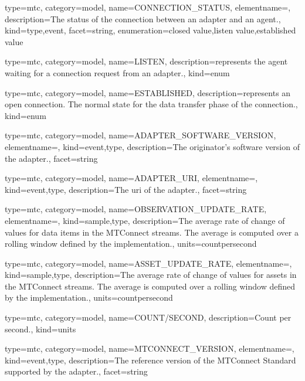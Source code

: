 {
  type=mtc,
  category=model,
  name={CONNECTION\_STATUS},
  elementname=,
  description={The status of the connection between an \gls{adapter} and an \gls{agent}.},
  kind={type,event},
  facet={\gls{string}},
  enumeration={\gls{closed value},\gls{listen value},\gls{established value}}
}

{
  type=mtc,
  category=model,
  name={LISTEN},
  description={represents the \gls{agent} waiting for a connection request from an \gls{adapter}.},
  kind={enum}
}

{
  type=mtc,
  category=model,
  name={ESTABLISHED},
  description={represents an open connection. The normal state for the data transfer phase of the connection.},
  kind={enum}
}

{
  type=mtc,
  category=model,
  name={ADAPTER\_SOFTWARE\_VERSION},
  elementname=,
  kind={event,type},
  description={The originator's software version of the \gls{adapter}.},
  facet={\gls{string}}
}

{
  type=mtc,
  category=model,
  name={ADAPTER\_URI},
  elementname=,
  kind={event,type},
  description={The \gls{uri} of the \gls{adapter}.},
  facet={\gls{string}}
}

{
  type=mtc,
  category=model,
  name={OBSERVATION\_UPDATE\_RATE},
  elementname=,
  kind={sample,type},
  description={The average rate of change of values for data items in the MTConnect streams. The average is computed over a rolling window defined by the implementation.},
  units={\gls{countpersecond}}
}

{
  type=mtc,
  category=model,
  name={ASSET\_UPDATE\_RATE},
  elementname=,
  kind={sample,type},
  description={The average rate of change of values for assets in the MTConnect streams. The average is computed over a rolling window defined by the implementation.},
  units={\gls{countpersecond}}
}

{
  type=mtc,
  category=model,
  name={COUNT/SECOND},
  description={Count per second.},
  kind={units}
}

{
  type=mtc,
  category=model,
  name={MTCONNECT\_VERSION},
  elementname=,
  kind={event,type},
  description={The reference version of the MTConnect Standard supported by the \gls{adapter}.},
  facet={\gls{string}}
}

